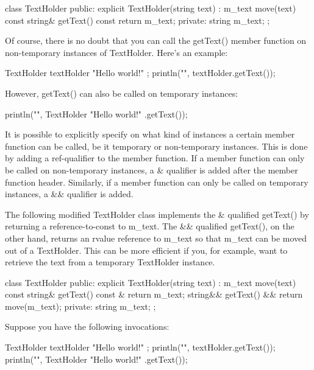 \begin{cpp}
class TextHolder
{
    public:
        explicit TextHolder(string text) : m_text { move(text) } {}
        const string& getText() const { return m_text; }
    private:
        string m_text;
};
\end{cpp}

Of course, there is no doubt that you can call the getText() member function on non-temporary instances of TextHolder. Here’s an example:

\begin{cpp}
TextHolder textHolder { "Hello world!" };
println("{}", textHolder.getText());
\end{cpp}

However, getText() can also be called on temporary instances:

\begin{cpp}
println("{}", TextHolder{ "Hello world!" }.getText());
\end{cpp}

It is possible to explicitly specify on what kind of instances a certain member function can be called, be it temporary or non-temporary instances. This is done by adding a ref-qualifier to the member function. If a member function can only be called on non-temporary instances, a \& qualifier is added after the member function header. Similarly, if a member function can only be called on temporary instances, a \&\& qualifier is added.

The following modified TextHolder class implements the \& qualified getText() by returning a reference-to-const to m\_text. The \&\& qualified getText(), on the other hand, returns an rvalue reference to m\_text so that m\_text can be moved out of a TextHolder. This can be more efficient if you, for example, want to retrieve the text from a temporary TextHolder instance.

\begin{cpp}
class TextHolder
{
    public:
        explicit TextHolder(string text) : m_text { move(text) } {}
        const string& getText() const & { return m_text; }
        string&& getText() && { return move(m_text); }
    private:
        string m_text;
};
\end{cpp}

Suppose you have the following invocations:

\begin{cpp}
TextHolder textHolder { "Hello world!" };
println("{}", textHolder.getText());
println("{}", TextHolder{ "Hello world!" }.getText());
\end{cpp}

